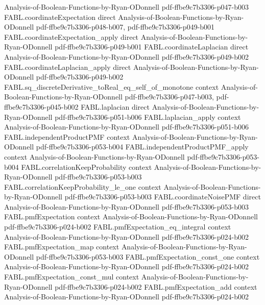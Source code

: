 \begin{theorem}
  {Analysis-of-Boolean-Functions-by-Ryan-ODonnell}
  {pdf-ffbe9c7b3306-p047-b003}
\proofstep
  {FABL.coordinateExpectation}
  {direct}
  {Analysis-of-Boolean-Functions-by-Ryan-ODonnell}
  {pdf-ffbe9c7b3306-p048-b007,
    pdf-ffbe9c7b3306-p049-b001}
\proofstep
  {FABL.coordinateExpectation_apply}
  {direct}
  {Analysis-of-Boolean-Functions-by-Ryan-ODonnell}
  {pdf-ffbe9c7b3306-p049-b001}
\proofstep
  {FABL.coordinateLaplacian}
  {direct}
  {Analysis-of-Boolean-Functions-by-Ryan-ODonnell}
  {pdf-ffbe9c7b3306-p049-b002}
\proofstep
  {FABL.coordinateLaplacian_apply}
  {direct}
  {Analysis-of-Boolean-Functions-by-Ryan-ODonnell}
  {pdf-ffbe9c7b3306-p049-b002}
\proofstep
  {FABL.sq_discreteDerivative_toReal_eq_self_of_monotone}
  {context}
  {Analysis-of-Boolean-Functions-by-Ryan-ODonnell}
  {pdf-ffbe9c7b3306-p047-b003,
    pdf-ffbe9c7b3306-p045-b002}
\proofstep
  {FABL.laplacian}
  {direct}
  {Analysis-of-Boolean-Functions-by-Ryan-ODonnell}
  {pdf-ffbe9c7b3306-p051-b006}
\proofstep
  {FABL.laplacian_apply}
  {context}
  {Analysis-of-Boolean-Functions-by-Ryan-ODonnell}
  {pdf-ffbe9c7b3306-p051-b006}
\proofstep
  {FABL.independentProductPMF}
  {context}
  {Analysis-of-Boolean-Functions-by-Ryan-ODonnell}
  {pdf-ffbe9c7b3306-p053-b004}
\proofstep
  {FABL.independentProductPMF_apply}
  {context}
  {Analysis-of-Boolean-Functions-by-Ryan-ODonnell}
  {pdf-ffbe9c7b3306-p053-b004}
\proofstep
  {FABL.correlationKeepProbability}
  {context}
  {Analysis-of-Boolean-Functions-by-Ryan-ODonnell}
  {pdf-ffbe9c7b3306-p053-b003}
\proofstep
  {FABL.correlationKeepProbability_le_one}
  {context}
  {Analysis-of-Boolean-Functions-by-Ryan-ODonnell}
  {pdf-ffbe9c7b3306-p053-b003}
\proofstep
  {FABL.coordinateNoisePMF}
  {direct}
  {Analysis-of-Boolean-Functions-by-Ryan-ODonnell}
  {pdf-ffbe9c7b3306-p053-b003}
\proofstep
  {FABL.pmfExpectation}
  {context}
  {Analysis-of-Boolean-Functions-by-Ryan-ODonnell}
  {pdf-ffbe9c7b3306-p024-b002}
\proofstep
  {FABL.pmfExpectation_eq_integral}
  {context}
  {Analysis-of-Boolean-Functions-by-Ryan-ODonnell}
  {pdf-ffbe9c7b3306-p024-b002}
\proofstep
  {FABL.pmfExpectation_map}
  {context}
  {Analysis-of-Boolean-Functions-by-Ryan-ODonnell}
  {pdf-ffbe9c7b3306-p053-b003}
\proofstep
  {FABL.pmfExpectation_const_one}
  {context}
  {Analysis-of-Boolean-Functions-by-Ryan-ODonnell}
  {pdf-ffbe9c7b3306-p024-b002}
\proofstep
  {FABL.pmfExpectation_const_mul}
  {context}
  {Analysis-of-Boolean-Functions-by-Ryan-ODonnell}
  {pdf-ffbe9c7b3306-p024-b002}
\proofstep
  {FABL.pmfExpectation_add}
  {context}
  {Analysis-of-Boolean-Functions-by-Ryan-ODonnell}
  {pdf-ffbe9c7b3306-p024-b002}

\end{theorem}
